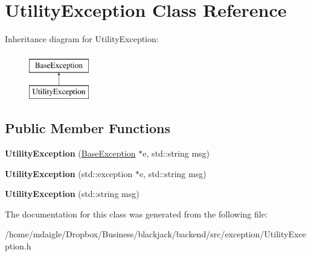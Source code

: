 \hypertarget{classUtilityException}{
\section{\-Utility\-Exception \-Class \-Reference}
\label{classUtilityException}
}
\-Inheritance diagram for \-Utility\-Exception\-:\begin{figure}[H]
\begin{center}
\leavevmode
\includegraphics[height=2.000000cm]{classUtilityException}
\end{center}
\end{figure}
\subsection*{\-Public \-Member \-Functions}
\begin{DoxyCompactItemize}
\item 
\hypertarget{classUtilityException_a30bdb24f45d39023ae8d8b67b19ff450}{
{\bfseries \-Utility\-Exception} (\hyperlink{classBaseException}{\-Base\-Exception} $\ast$e, std\-::string msg)}
\label{classUtilityException_a30bdb24f45d39023ae8d8b67b19ff450}

\item 
\hypertarget{classUtilityException_aabe4627245da479230c9b07fa0d6027a}{
{\bfseries \-Utility\-Exception} (std\-::exception $\ast$e, std\-::string msg)}
\label{classUtilityException_aabe4627245da479230c9b07fa0d6027a}

\item 
\hypertarget{classUtilityException_a5b1231d6d4c4443f2a956457628cf5e2}{
{\bfseries \-Utility\-Exception} (std\-::string msg)}
\label{classUtilityException_a5b1231d6d4c4443f2a956457628cf5e2}

\end{DoxyCompactItemize}


\-The documentation for this class was generated from the following file\-:\begin{DoxyCompactItemize}
\item 
/home/mdaigle/\-Dropbox/\-Business/blackjack/backend/src/exception/\-Utility\-Exception.\-h\end{DoxyCompactItemize}
